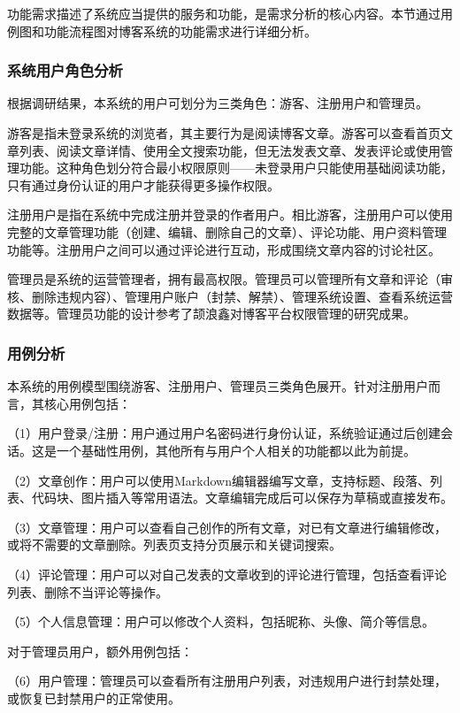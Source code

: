 \documentclass[UTF8,AutoFakeBold=1,AutoFakeSlant,zihao=-4]{SCAU}
\begin{document}
 功能需求描述了系统应当提供的服务和功能，是需求分析的核心内容。本节通过用例图和功能流程图对博客系统的功能需求进行详细分析。

 \subsubsection{系统用户角色分析}

 根据调研结果，本系统的用户可划分为三类角色：游客、注册用户和管理员。

 游客是指未登录系统的浏览者，其主要行为是阅读博客文章。游客可以查看首页文章列表、阅读文章详情、使用全文搜索功能，但无法发表文章、发表评论或使用管理功能。这种角色划分符合最小权限原则——未登录用户只能使用基础阅读功能，只有通过身份认证的用户才能获得更多操作权限。

 注册用户是指在系统中完成注册并登录的作者用户。相比游客，注册用户可以使用完整的文章管理功能（创建、编辑、删除自己的文章）、评论功能、用户资料管理功能等。注册用户之间可以通过评论进行互动，形成围绕文章内容的讨论社区。

 管理员是系统的运营管理者，拥有最高权限。管理员可以管理所有文章和评论（审核、删除违规内容）、管理用户账户（封禁、解禁）、管理系统设置、查看系统运营数据等。管理员功能的设计参考了颉浪鑫{\citep{颉浪鑫2023}}对博客平台权限管理的研究成果。

\subsubsection{用例分析}

本系统的用例模型围绕游客、注册用户、管理员三类角色展开。针对注册用户而言，其核心用例包括：

 （1）用户登录/注册：用户通过用户名密码进行身份认证，系统验证通过后创建会话。这是一个基础性用例，其他所有与用户个人相关的功能都以此为前提。

 （2）文章创作：用户可以使用Markdown编辑器编写文章，支持标题、段落、列表、代码块、图片插入等常用语法。文章编辑完成后可以保存为草稿或直接发布{\citep{曾广海2016}}。

 （3）文章管理：用户可以查看自己创作的所有文章，对已有文章进行编辑修改，或将不需要的文章删除。列表页支持分页展示和关键词搜索。

 （4）评论管理：用户可以对自己发表的文章收到的评论进行管理，包括查看评论列表、删除不当评论等操作。

 （5）个人信息管理：用户可以修改个人资料，包括昵称、头像、简介等信息。

 对于管理员用户，额外用例包括：

 （6）用户管理：管理员可以查看所有注册用户列表，对违规用户进行封禁处理，或恢复已封禁用户的正常使用。
\end{document}
